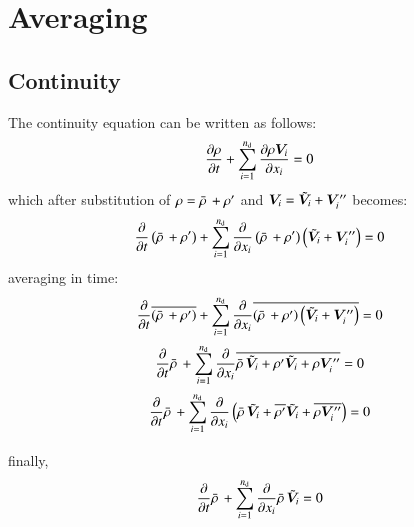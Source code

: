 \documentclass{warpdoc}
\newcommand{\alb}{\vspace{0.2cm}\\} %
\newcommand{\nd}{{{n}_{\rm d}}}
\newcommand{\mfd}{\displaystyle}
\begin{document}
\section{Averaging}



\subsection{Continuity}

The continuity equation can be written as follows:
%
\begin{equation}
  \frac{\partial \rho }{\partial t} + \sum_{i=1}^{\nd} \frac{\partial \rho \bm{V}_i }{\partial x_i} =0
  \label{eqn:C:1}
\end{equation}
%
which after substitution of $\rho=\bar{\rho}\,+\rho^{\prime}$ and $\bm{V}_i={\tilde{\bm{V}}_i}+\bm{V}_i^{\prime\prime}$
becomes:
%
\begin{equation}
  \frac{\partial}{\partial t} \left( \wbar{\rho}\,+\rho^{\prime} \right)  + \sum_{i=1}^{\nd}
     \frac{\partial}{\partial x_i} \left( \wbar{\rho}\,+\rho^{\prime}\right)
           \left( {\wtilde{\bm{V}}_i}+\bm{V}_i^{\prime\prime} \right) =0
  \label{eqn:C:2}
\end{equation}
%
averaging in time:
%
\begin{equation}
  \begin{array}{c}
    \mfd\frac{\partial}{\partial t} \overline{\left( \wbar{\rho}\,+\rho^{\prime} \right)}
     + \sum_{i=1}^{\nd}
       \frac{\partial}{\partial x_i} \overline{\left( \wbar{\rho}\,+\rho^{\prime}\right)
             \left( {\wtilde{\bm{V}}_i}+\bm{V}_i^{\prime\prime} \right)} =0 \alb
    \mfd\frac{\partial}{\partial t} \wbar{\rho}\,
     + \sum_{i=1}^{\nd}
       \frac{\partial}{\partial x_i} \overline{\wbar{\rho}\, {\wtilde{\bm{V}}_i}+\rho^{\prime} {\wtilde{\bm{V}}_i}+\rho \bm{V}_i^{\prime\prime}} =0 \alb
    \mfd\frac{\partial}{\partial t} \wbar{\rho}\,
     + \sum_{i=1}^{\nd}
       \frac{\partial}{\partial x_i} \left(
          \wbar{\rho}\, {\wtilde{\bm{V}}_i}
          +\overline{\rho^{\prime}} {\wtilde{\bm{V}}_i}+\overline{\rho \bm{V}_i^{\prime\prime}} \right) =0 \alb
  \end{array}
\end{equation}
%
finally,
%
\begin{equation}
    \mfd\frac{\partial}{\partial t} \wbar{\rho}\,
     + \sum_{i=1}^{\nd}
       \frac{\partial}{\partial x_i}
          \wbar{\rho}\, {\wtilde{\bm{V}}_i}
           =0 
    \label{eqn:C:final}
\end{equation}
%
\end{document}
